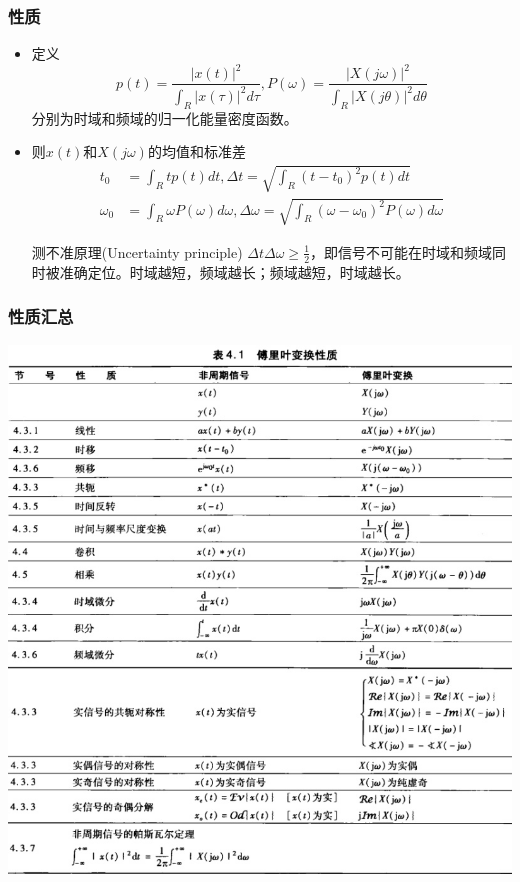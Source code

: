 \documentclass[CJKutf8,xcolor=pdftex,dvipsnames,table]{beamer}
\begin{document}
\begin{CJK*}{UTF8}{song}
\begin{frame}
\begin{itemize}
    \end{itemize}
  \end{frame}   

  \begin{frame}
    \frametitle{性质}
    \begin{itemize}
    \item 定义
    \[
    	p(t) = \frac{|x(t)|^2}{\int_R |x(\tau)|^2d\tau}, P(\omega) = \frac{|X(j\omega)|^2}{\int_R |X(j\theta)|^2d\theta}
    \]
    分别为时域和频域的归一化能量密度函数。
    \item 则$x(t)$和$X(j\omega)$的均值和标准差
    \begin{align*}
    	t_0 & = \int_R tp(t)dt, \Delta t = \sqrt{\int_R (t-t_0)^2 p(t)dt} \\
		\omega_0 & = \int_R \omega P(\omega)d\omega, \Delta \omega = \sqrt{\int_R (\omega-\omega_0)^2 P(\omega)d\omega}
    \end{align*}
	\begin{block}{测不准原理(Uncertainty principle)}
		$\Delta t \Delta \omega \geq \frac{1}{2}$，即信号不可能在时域和频域同时被准确定位。时域越短，频域越长；频域越短，时域越长。
	\end{block}	
    \end{itemize}
  \end{frame}   

  \begin{frame}
    \frametitle{性质汇总}
    \begin{center}
      \includegraphics[scale=.28]{ss-c-t4-1}
    \end{center}
  \end{frame}  


\end{CJK*}
\end{document}
